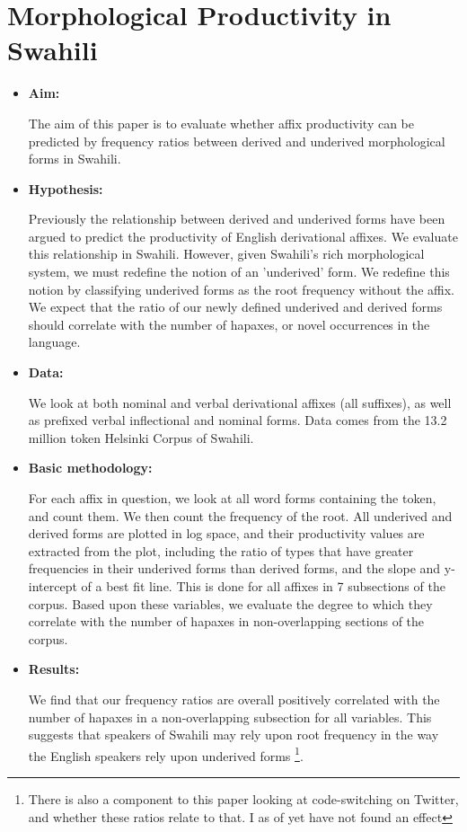 \documentclass{article}\usepackage[]{graphicx}\usepackage[]{color}
\begin{document}
  \section{Morphological Productivity in Swahili}
  \begin{itemize}
    \item[] \textbf{Aim:}
    \par The aim of this paper is to evaluate whether affix productivity can be predicted by frequency ratios between derived and underived morphological forms in Swahili.
    \item[] \textbf{Hypothesis:}
    \par Previously the relationship between derived and underived forms have been argued to predict the productivity of English derivational affixes. We evaluate this relationship in Swahili. However, given Swahili's rich morphological system, we must redefine the notion of an 'underived' form. We redefine this notion by classifying underived forms as the root frequency without the affix. We expect that the ratio of our newly defined underived and derived forms should correlate with the number of hapaxes, or novel occurrences in the language.
    \item[] \textbf{Data:}
    \par We look at both nominal and verbal derivational affixes (all suffixes), as well as prefixed verbal inflectional and nominal forms. Data comes from the 13.2 million token Helsinki Corpus of Swahili.
    \item[] \textbf{Basic methodology:}
    \par For each affix in question, we look at all word forms containing the token, and count them. We then count the frequency of the root. All underived and derived forms are plotted in log space, and their productivity values are extracted from the plot, including the ratio of types that have greater frequencies in their underived forms than derived forms, and the slope and y-intercept of a best fit line. This is done for all affixes in 7 subsections of the corpus. Based upon these variables, we evaluate the degree to which they correlate with the number of hapaxes in non-overlapping sections of the corpus.
    \item[] \textbf{Results:}
    \par We find that our frequency ratios are overall positively correlated with the number of hapaxes in a non-overlapping subsection for all variables. This suggests that speakers of Swahili may rely upon root frequency in the way the English speakers rely upon underived forms \footnote{There is also a component to this paper looking at code-switching on Twitter, and whether these ratios relate to that. I as of yet have not found an effect}.
  \end{itemize}
  \newpage
\end{document}
